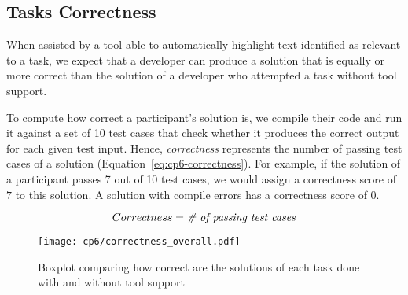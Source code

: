 
\subsection{Tasks Correctness}
\label{cp6:correctness}



When assisted by a tool able to automatically highlight text identified as relevant to a task, we expect that a developer can produce a solution 
that is equally or more correct than the solution of a developer who attempted a task without tool support. 


To compute how correct a participant's solution is, 
we compile their code and run it against a set of 10 test cases that check whether it produces the correct output for each given test input. 
Hence, \textit{correctness} represents the number of passing test cases of a solution (Equation~\ref{eq:cp6-correctness}).
For example, if the solution of a participant passes 7 out of 10 test cases, we would assign a 
correctness score of $7$ to this solution. 
A solution with compile errors has a correctness score of $0$.


\smallskip
\begin{small}


\begin{equation}
    Correctness = \text{\textit{\# of passing test cases}}
    \label{eq:cp6-correctness}
\end{equation}
\end{small}




\begin{figure}[h!]
    \centering
    \texttt{[image: cp6/correctness\_overall.pdf]}
    \caption{Boxplot comparing how correct are the solutions of each task done with and without tool support}
    \label{fig:correctness-by-task}
\end{figure}

